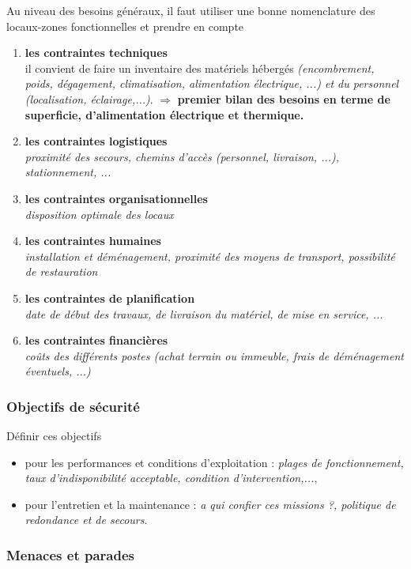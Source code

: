 \documentclass[10pt,a4paper,oneside,titlepage]{report}
\newcommand{\titre}[1]{\textcolor{title}{#1}}
\newcommand{\strong}[1]{\textbf{\titre{#1}}}
\begin{document}
\begin{sffamily}
Au niveau des besoins généraux, il faut utiliser une bonne nomenclature des locaux-zones fonctionnelles et prendre en compte
\begin{enumerate}
\item \strong{les contraintes techniques}\\
il convient de faire un inventaire des matériels hébergés  \textit{(encombrement, poids, dégagement, climatisation, alimentation électrique, ...) et du personnel \textit{(localisation, éclairage,...)}}. $\Rightarrow$ \strong{premier bilan des besoins 
en terme de superficie, d'alimentation électrique et thermique.}
\item \strong{les contraintes logistiques}\\
\textit{proximité des secours, chemins d'accès (personnel, livraison, ...), stationnement, ...}
\item \strong{les contraintes organisationnelles}\\
\textit{disposition optimale des locaux}
\item \strong{les contraintes humaines}\\
\textit{installation et déménagement, proximité des moyens de transport, possibilité de restauration}
\item \strong{les contraintes de planification}\\
\textit{date de début des travaux, de livraison du matériel, de mise en service, ...}
\item \strong{les contraintes financières}\\
\textit{coûts des différents postes (achat terrain ou immeuble, frais de déménagement éventuels, ...)}
\end{enumerate}

\subsubsection{Objectifs de sécurité}

Définir ces objectifs
\begin{itemize}
\item pour les performances et conditions d'exploitation : \textit{plages de fonctionnement, taux d'indisponibilité acceptable, condition d'intervention,...},
\item pour l'entretien et la maintenance : \textit{a qui confier ces missions ?, politique de redondance et de secours}.
\end{itemize}

\subsubsection{Menaces et parades}


\end{sffamily}
\end{document}
